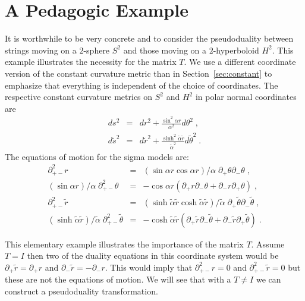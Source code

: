 \documentclass[a4paper,12pt]{article}
\newcommand{\alphatil}{\tilde{\alpha}}
\newcommand{\rtil}{\tilde{r}}
\newcommand{\thetatil}{\tilde{\theta}}
\begin{document}
\section{A Pedagogic Example}
\label{sec:pedagogic}

It is worthwhile to be very concrete and to consider the pseudoduality
between strings moving on a $2$-sphere $S^{2}$ and those moving on a
$2$-hyperboloid $H^{2}$.  This example illustrates the necessity for
the matrix $T$.  We use a different coordinate version of the constant
curvature metric than in Section~\ref{sec:constant} to emphasize that
everything is independent of the choice of coordinates.  The
respective constant curvature metrics on $S^{2}$ and $H^{2}$ in polar
normal coordinates are
\begin{eqnarray*}
    ds^{2} & = & dr^{2} + \frac{\sin^{2}\alpha r}{\alpha^{2}}d\theta^{2}\;,
    \\
    d\tilde{s}^{2} & = & d\rtil^{2} + \frac{\sinh^{2}\alphatil
    \rtil}{\alphatil^{2}}d\thetatil^{2}\;.
\end{eqnarray*}
The equations of motion for the sigma models are:
\begin{eqnarray}
    \partial^{2}_{+-} r & = & (\sin \alpha r \cos\alpha r)/\alpha \;
    	\partial_{+}\theta \partial_{-}\theta\;,
	\label{eq:EOMr}\\
    (\sin\alpha r)/\alpha\; \partial^{2}_{+-} \theta & = & 
    	- \cos \alpha r (\partial_{+}r \partial_{-}\theta 
	+ \partial_{-}r \partial_{+}\theta)\;,
	\label{eq:EOMtheta}\\
    \partial^{2}_{+-} \rtil & = & 
    	(\sinh \alphatil \rtil \cosh\alphatil \rtil)/\alphatil \; 
    	\partial_{+}\thetatil \partial_{-}\thetatil\;,
	\label{eq:EOMrtil}\\
    (\sinh\alphatil \rtil)/\alphatil\; \partial^{2}_{+-} \thetatil & = & 
    	- \cosh \alphatil \rtil (\partial_{+}\rtil \partial_{-}\thetatil 
	+ \partial_{-}\rtil \partial_{+}\thetatil)\;.
	\label{eq:EOMthetatil}
\end{eqnarray}

This elementary example illustrates the importance of the matrix $T$. 
Assume $T=I$ then two of the duality equations in this coordinate
system would be $\partial_{+}\rtil = \partial_{+} r$ and
$\partial_{-}\rtil = -\partial_{-} r$.  This would imply that
$\partial^{2}_{+-}r=0$ and $\partial^{2}_{+-}\rtil=0$ but these are
not the equations of motion. We will see that with a $T\neq I$ we can 
construct a pseudoduality transformation.
\end{document}
